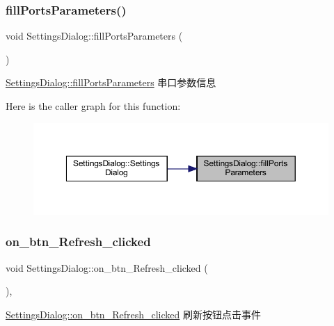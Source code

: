 \subsubsection{\texorpdfstring{fillPortsParameters()}{fillPortsParameters()}}
{\footnotesize\ttfamily void Settings\+Dialog\+::fill\+Ports\+Parameters (\begin{DoxyParamCaption}{ }\end{DoxyParamCaption})\hspace{0.3cm}{\ttfamily [private]}}



\mbox{\hyperlink{class_settings_dialog_ac2a0ea7c05f7cb98e3bc2474981bc5e7}{Settings\+Dialog\+::fill\+Ports\+Parameters}} 串口参数信息 

Here is the caller graph for this function\+:
\nopagebreak
\begin{figure}[H]
\begin{center}
\leavevmode
\includegraphics[width=350pt]{class_settings_dialog_ac2a0ea7c05f7cb98e3bc2474981bc5e7_icgraph}
\end{center}
\end{figure}
\mbox{\label{class_settings_dialog_a216e718d94b9766dbce166b37ebdc87b}} 
\subsubsection{\texorpdfstring{on\_btn\_Refresh\_clicked}{on\_btn\_Refresh\_clicked}}
{\footnotesize\ttfamily void Settings\+Dialog\+::on\+\_\+btn\+\_\+\+Refresh\+\_\+clicked (\begin{DoxyParamCaption}{ }\end{DoxyParamCaption})\hspace{0.3cm}{\ttfamily [private]}, {\ttfamily [slot]}}



\mbox{\hyperlink{class_settings_dialog_a216e718d94b9766dbce166b37ebdc87b}{Settings\+Dialog\+::on\+\_\+btn\+\_\+\+Refresh\+\_\+clicked}} 刷新按钮点击事件 

